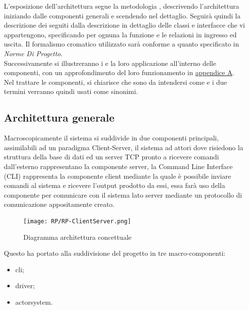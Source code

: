 \documentclass{scalatekids-article}
\begin{document}
L'esposizione dell'architettura segue la metodologia ,
descrivendo l'architettura iniziando dalle componenti generali e scendendo
nel dettaglio. Seguirà quindi la descrizione dei  seguiti dalla descrizione
in dettaglio delle classi e interfacce che vi appartengono, specificando
per ognuna la funzione e le relazioni in ingresso ed uscita. Il formalismo
cromatico utilizzato sarà conforme a quanto specificato in \textit{Norme Di Progetto}.\\
Successivamente si illustreranno i  e la loro applicazione
all'interno delle componenti, con un approfondimento del loro funzionamento
in \hyperref[sec:appendice]{appendice A}.\\
Nel trattare le componenti, si chiarisce che sono da intendersi come 
e i due termini verranno quindi usati come sinonimi.\\

\subsection{Architettura generale}

Macroscopicamente il sistema si suddivide in due componenti principali,
assimilabili ad un paradigma Client-Server, il sistema ad attori dove
risiedono la struttura della base di dati ed un server TCP pronto a ricevere
comandi dall'esterno rappresentano la componente server, la Command Line
Interface (CLI) rappresenta la componente client mediante la quale è possibile
inviare comandi al sistema e ricevere l'output prodotto da essi, essa farà uso
della componente  per comunicare con il sistema lato server
mediante un protocollo di comunicazione appositamente creato.\\

\begin{figure}[H]
  \begin{center}
    \texttt{[image: RP/RP-ClientServer.png]}
    \caption{Diagramma architettura concettuale}
  \end{center}
\end{figure}

Questo ha portato alla suddivisione del progetto in tre macro-componenti:
\begin{itemize}
\item cli;
\item driver;
\item actorsystem.
\end{itemize}
\end{document}
